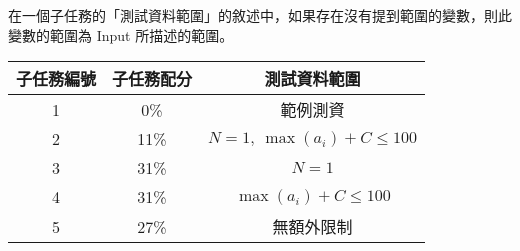 \documentclass[11pt,a4paper]{article}
\begin{document}
在一個子任務的「測試資料範圍」的敘述中，如果存在沒有提到範圍的變數，則此變數的範圍為 Input 所描述的範圍。

\begin{center}
 \begin{tabular}{||c c c||} 
 \hline
 子任務編號 & 子任務配分 & 測試資料範圍 \\  
 \hline
 \hline
 1 & 0\% & 範例測資 \\ 
 \hline
 2 & 11\% & $N =  1,\ \max(a_i) + C \le 100 $ \\
 \hline 
 3 & 31\% & $N = 1$ \\
 \hline
 4 & 31\% & $\max(a_i) + C \le 100$ \\
 \hline
 5 & 27\% & 無額外限制 \\
 \hline

\end{tabular}
\end{center}
\end{document}
